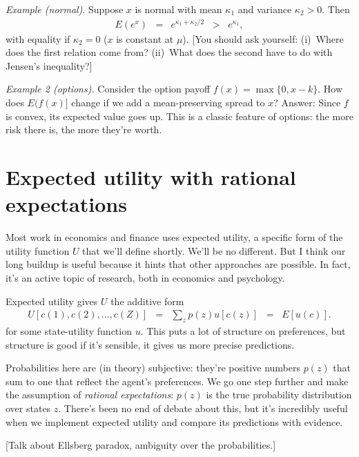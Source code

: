 \documentclass[11pt]{article}
\begin{document}
{\it Example (normal)\/}.
Suppose $x$ is normal with mean $\kappa_1$ and variance $\kappa_2>0$.
Then
\begin{eqnarray*}
    E \left( e^x \right) &=&  e^{\kappa_1 + \kappa_2/2}
            \;\;>\;\; e^{\kappa_1},
\end{eqnarray*}
with equality if $\kappa_2 = 0$ ($x$ is constant at $\mu$).
[You should ask yourself:
(i)~Where does the first relation come from?
(ii)~What does the second have to do with Jensen's inequality?]

{\it Example 2 (options).\/}
Consider the option payoff $ f(x) = \max \{ 0, x-k \} $.
How does $E(f(x)]$ change if we add a mean-preserving spread to $x$?
Answer: Since $f$ is convex, its expected value goes up.
This is a classic feature of options:
the more risk there is, the more they're worth.



\section{Expected utility with rational expectations}

Most work in economics and finance uses expected utility,
a specific form of the utility function $U$ that we'll define shortly.
We'll be no different.
But I think our long buildup is useful because it hints
that other approaches are possible.
In fact, it's an active topic of research,
both in economics and psychology.

Expected utility gives $U$ the additive form
\begin{eqnarray}
    U [c(1), c(2), \ldots, c(Z)]
            &=& \sum_z p(z) u[c(z)]  \;\;=\;\;  E [u(c)] .
\end{eqnarray}
for some state-utility function $u$.
This puts a lot of structure on preferences,
but structure is good if it's sensible,
it gives us more precise predictions.


Probabilities here are (in theory) subjective:
they're positive numbers $p(z)$ that sum to one that reflect
the agent's preferences.
We go one step further and make the assumption
of {\it rational expectations\/}:
$p(z)$ is the true probability distribution over states $z$.
There's been no end of debate about this,
but it's incredibly useful when we implement
expected utility and compare its predictions with evidence.

[Talk about Ellsberg paradox, ambiguity over the probabilities.]
\end{document}
